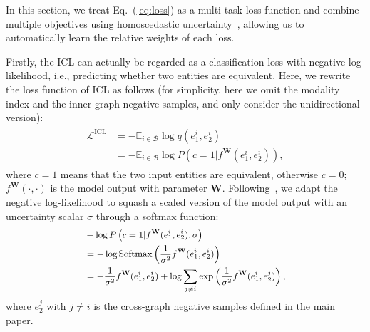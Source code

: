 \documentclass[11pt]{article}
\begin{document}
In this section, we treat Eq.~(\ref{eq:loss}) as a multi-task loss function and combine multiple objectives using homoscedastic uncertainty~\cite{kendall2018multi}, allowing us to automatically learn the relative weights of each loss.

Firstly, the ICL can actually be regarded as a classification loss with negative log-likelihood, i.e., predicting whether two entities are equivalent. Here, we rewrite the loss function of ICL as follows (for simplicity, here we omit the modality index and the inner-graph negative samples, and only consider the unidirectional version):
\begin{gather}
\begin{aligned}
    \mathcal{L}^{\text{ICL}} 
    &= - \mathbb{E}_{i\in\mathcal{B}} 
    \log q(e^i_1,e^i_2) \\
    &= - \mathbb{E}_{i\in\mathcal{B}} 
    \log P\left(c=1|f^{\mathbf{W}}(e^i_1,e^i_2)\right),
\end{aligned}
\end{gather}
where $c=1$ means that the two input entities are equivalent, otherwise $c=0$; $f^{\mathbf{W}}(\cdot,\cdot)$ is the model output with parameter $\mathbf{W}$.
Following~\cite{kendall2018multi}, we adapt the negative log-likelihood to squash a scaled version of the model output with an uncertainty scalar $\sigma$ through a softmax function:
\begin{gather}
\begin{small}
\begin{aligned}
    &-\log P\left(c=1|f^{\mathbf{W}}(e^i_1,e^i_2), \sigma\right) \\
    &= -\log \text{Softmax} \left(\frac{1}{\sigma^2}f^{\mathbf{W}}(e^i_1,e^i_2)\right) \\
    &= -\frac{1}{\sigma^2}f^{\mathbf{W}}(e^i_1,e^i_2)
    + \log \sum_{j\neq i}\exp\left(
    \frac{1}{\sigma^2}f^{\mathbf{W}}(e^i_1,e^j_2)
    \right),
    \label{eq:log}
\end{aligned}
\end{small}
\end{gather}
where $e^j_2$ with $j\neq i$ is the cross-graph negative samples defined in the main paper.
\end{document}

